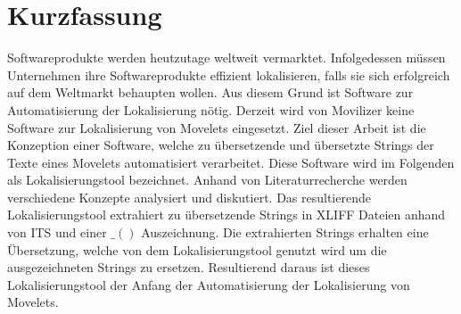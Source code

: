 \chapter*{Kurzfassung}
Softwareprodukte werden heutzutage weltweit vermarktet. Infolgedessen müssen Unternehmen ihre Softwareprodukte effizient lokalisieren, falls sie sich erfolgreich auf dem Weltmarkt behaupten wollen. 
\autocite[Vgl.][S. 1]{Schmitz.2000}
\autocite[Vgl.][S. 1]{Reineke.2005} 
Aus diesem Grund ist Software zur Automatisierung der Lokalisierung nötig. 
Derzeit wird von Movilizer keine Software zur Lokalisierung von Movelets eingesetzt. 
Ziel dieser Arbeit ist die Konzeption einer Software, welche zu übersetzende und übersetzte Strings der Texte eines Movelets automatisiert verarbeitet. Diese Software wird im Folgenden als Lokalisierungstool bezeichnet. 
Anhand von Literaturrecherche werden verschiedene Konzepte analysiert und diskutiert. 
Das resultierende Lokalisierungstool extrahiert zu übersetzende Strings in XLIFF Dateien anhand von ITS und einer $\_()$ Auszeichnung. Die extrahierten Strings erhalten eine Übersetzung, welche von dem Lokalisierungstool genutzt wird um die ausgezeichneten Strings zu ersetzen. 
Resultierend daraus ist dieses Lokalisierungstool der Anfang der Automatisierung der Lokalisierung von Movelets.